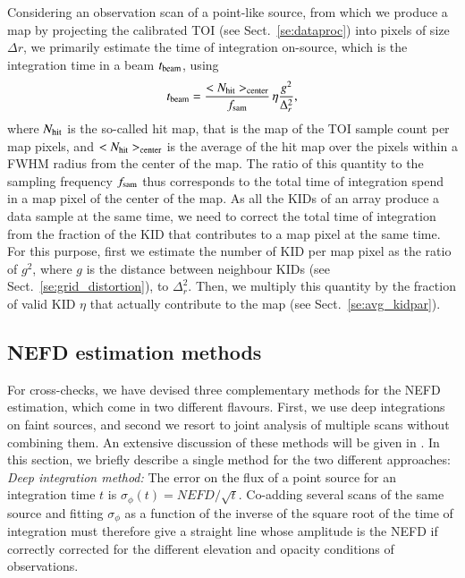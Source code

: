Considering an observation scan of a point-like source, from which we
produce a map by projecting the calibrated TOI (see
Sect.~\ref{se:dataproc}) into pixels of size $\Delta r$, we primarily
estimate the time of integration on-source, which is the integration
time in a beam $t_{\rm{beam}}$, using
%
\begin{equation}
  t_{\rm{beam}} = \frac{<N_{\rm{hit}}>_{\rm{center}}}{f_{\rm{sam}}}\,
  \eta \frac{g^2}{\Delta_r^2},
\end{equation}
%
where $N_{\rm{hit}}$ is the so-called hit map, that is the map of the
TOI sample count per map pixels, and $<N_{\rm{hit}}>_{\rm{center}}$
is the average of the hit map over the pixels within a FWHM radius
from the center of the map. The ratio of this quantity to the sampling
frequency $f_{\rm{sam}}$ thus corresponds to the total time of integration
spend in a map pixel of the center of the map. As all the KIDs of an
array produce a data sample at the same time, we need to correct the
total time of integration from the fraction of the KID that
contributes to a map pixel at the same time. For this purpose, first
we estimate the number of KID per map pixel as the ratio of $g^2$,
where $g$ is the distance between neighbour KIDs (see
Sect.~\ref{se:grid_distortion}), to $\Delta_r^2$. Then, we multiply
this quantity by the fraction of valid KID $\eta$ that actually
contribute to the map (see Sect.~\ref{se:avg_kidpar}). 



\subsection{NEFD estimation methods}
\label{se:nefd_method}

For cross-checks, we have devised three complementary methods for the
NEFD estimation, which come in two different flavours. First, we
use deep integrations on faint sources, and second we resort to 
joint analysis of multiple scans without combining them. An
extensive discussion of these methods will be given in
\citet{Ponthieu2019}. In this section, we briefly describe a single method
for the two different approaches: \\

\noindent \emph{Deep integration method:} The error on the flux of a point source for an
integration time $t$ is $\sigma_\phi(t) = NEFD/\sqrt{t}$. Co-adding several scans of
the same source and fitting $\sigma_\phi$ as a function of the
inverse of the square root of the
time of integration must therefore give a straight line whose
amplitude is the NEFD if correctly corrected for the different
elevation and opacity conditions of observations.\\

